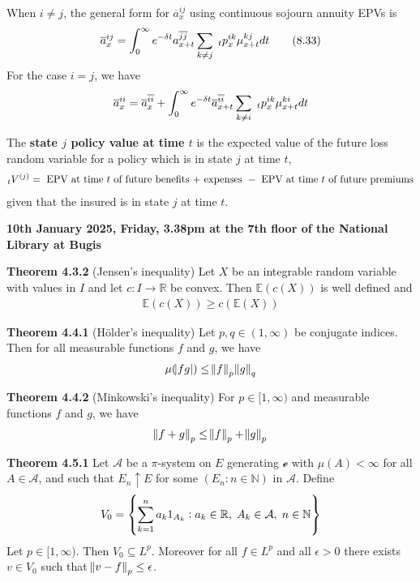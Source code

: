 \documentclass[hidelinks, 12pt]{article}
\theoremstyle{mydefstyle}
\theoremstyle{mythmstyle}
\begin{document}
When $i \ne j$, the general form for $\overline{a}_x^{ij}$ using continuous sojourn annuity EPVs is
\begin{gather*}
\overline{a}_x^{ij} = \int_0^{\infty} e^{-\delta t} a^{\overline{jj}}_{x+t} \sum_{k \ne j} \hspace{1mm}_tp_x^{ik} \mu_{x+t}^{kj} dt
\tag{8.33}
\end{gather*}
For the case $i = j$, we have
\begin{gather*}
\overline{a}_x^{ii}
= \overline{a}_x^{\overline{ii}} + \int_0^{\infty} e^{-\delta t} \overline{a}_{x+t}^{\overline{ii}} \sum_{k \ne i} \hspace{1mm}_tp_x^{ik} \mu_{x+t}^{ki} dt
\end{gather*}

The \textbf{state $j$ policy value at time $t$} is the expected value of the future loss random variable for a policy which is in state $j$ at time $t$,
\begin{gather*}
\hspace{0mm}_tV^{(j)}
= \mbox{ EPV at time $t$ of future benefits + expenses }
- \mbox{ EPV at time $t$ of future premiums}
\end{gather*}
given that the insured is in state $j$ at time $t$. 

\newpage

\textbf{10th January 2025, Friday, 3.38pm at the 7th floor of the National Library at Bugis}

\textbf{Theorem 4.3.2} (Jensen's inequality) Let $X$ be an integrable random variable with values in $I$ and let $c : I \to \mathbb{R}$ be convex. Then $\mathbb{E}(c(X))$ is well defined and
\begin{gather*}
\mathbb{E}(c(X)) \ge c(\mathbb{E}(X))
\end{gather*}

\textbf{Theorem 4.4.1} (H{\"o}lder's inequality) Let $p, q \in (1, \infty)$ be conjugate indices. Then for all measurable functions $f$ and $g$, we have
\begin{gather*}
\mu(\abs{fg}) \le \norm{f}_p \norm{g}_q
\end{gather*}

\textbf{Theorem 4.4.2} (Minkowski's inequality) For $p \in [1, \infty)$ and measurable functions $f$ and $g$, we have
\begin{gather*}
\norm{f + g}_p \le \norm{f}_p + \norm{g}_p
\end{gather*}

\textbf{Theorem 4.5.1} Let $\mathcal{A}$ be a $\pi$-system on $E$ generating $\mathcal{e}$ with $\mu(A) < \infty$ for all $A \in \mathcal{A}$, and such that $E_n \uparrow E$ for some $(E_n : n \in \mathbb{N})$ in $\mathcal{A}$. Define
\begin{gather*}
V_0 = \left\{ \sum_{k = 1}^n a_k 1_{A_k} : a_k \in \mathbb{R}, \hspace{1mm} A_k \in \mathcal{A}, \hspace{1mm} n \in \mathbb{N} \right\}
\end{gather*}
Let $p \in [1, \infty)$. Then $V_0 \subseteq L^p$. Moreover for all $f \in L^p$ and all $\epsilon > 0$ there exists $v \in V_0$ such that $\norm{v - f}_p \le \epsilon$. 
\end{document}
